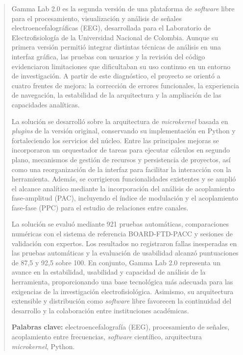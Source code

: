 \documentclass[12pt,letterpaper,oneside]{article}
\begin{document}
\begin{abstract}
Gamma Lab 2.0 es la segunda versión de una plataforma de \textit{software} libre para el procesamiento, visualización y análisis de señales electroencefalográficas (EEG), desarrollada para el Laboratorio de Electrofisiología de la Universidad Nacional de Colombia. Aunque su primera versión permitió integrar distintas técnicas de análisis en una interfaz gráfica, las pruebas con usuarios y la revisión del código evidenciaron limitaciones que dificultaban su uso continuo en un entorno de investigación. A partir de este diagnóstico, el proyecto se orientó a cuatro frentes de mejora: la corrección de errores funcionales, la experiencia de navegación, la estabilidad de la arquitectura y la ampliación de las capacidades analíticas.

La solución se desarrolló sobre la arquitectura de \textit{microkernel} basada en \textit{plugins} de la versión original, conservando su implementación en Python y fortaleciendo los servicios del núcleo. Entre las principales mejoras se incorporaron un orquestador de tareas para ejecutar cálculos en segundo plano, mecanismos de gestión de recursos y persistencia de proyectos, así como una reorganización de la interfaz para facilitar la interacción con la herramienta. Además, se corrigieron funcionalidades existentes y se amplió el alcance analítico mediante la incorporación del análisis de acoplamiento fase-amplitud (PAC), incluyendo el índice de modulación y el acoplamiento fase-fase (PPC) para el estudio de relaciones entre canales.

La solución se evaluó mediante 921 pruebas automáticas, comparaciones numéricas con el sistema de referencia BOARD-FTD-PACC y sesiones de validación con expertos. Los resultados no registraron fallas inesperadas en las pruebas automáticas y la evaluación de usabilidad alcanzó puntuaciones de 87,5 y 92,5 sobre 100. En conjunto, Gamma Lab 2.0 representa un avance en la estabilidad, usabilidad y capacidad de análisis de la herramienta, proporcionando una base tecnológica más adecuada para las exigencias de la investigación electrofisiológica. Asimismo, su arquitectura extensible y distribución como \textit{software} libre favorecen la continuidad del desarrollo y la colaboración entre instituciones académicas.

\textbf{Palabras clave:} electroencefalografía (EEG), procesamiento de señales, acoplamiento entre frecuencias, \textit{software} científico, arquitectura \textit{microkernel}, Python.
\end{abstract}
\end{document}
